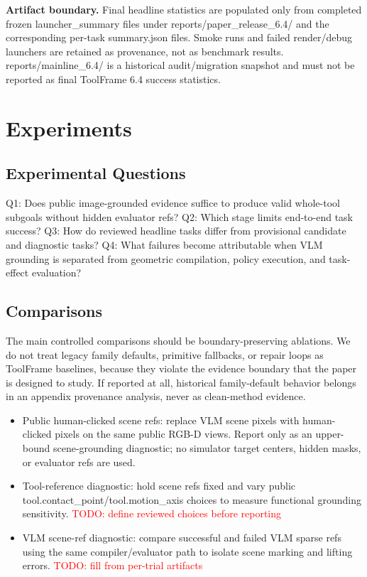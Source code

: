 \documentclass[journal]{IEEEtran}
\newcommand{\todo}[1]{\textcolor{red}{TODO: #1}}
\newcommand{\method}{ToolFrame}
\begin{document}
\textbf{Artifact boundary.} Final headline statistics are populated only from
completed frozen launcher\_summary files under reports/paper\_release\_6.4/ and
the corresponding per-task summary.json files. Smoke runs and failed
render/debug launchers are retained as provenance, not as benchmark results.
reports/mainline\_6.4/ is a historical audit/migration snapshot and must not be
reported as final \method{} 6.4 success statistics.

\section{Experiments}
\subsection{Experimental Questions}
Q1: Does public image-grounded evidence suffice to produce valid whole-tool
subgoals without hidden evaluator refs? Q2: Which stage limits end-to-end task
success? Q3: How do reviewed headline tasks differ from provisional candidate
and diagnostic tasks? Q4: What failures become attributable when VLM grounding
is separated from geometric compilation, policy execution, and task-effect
evaluation?

\subsection{Comparisons}
The main controlled comparisons should be boundary-preserving ablations. We do
not treat legacy family defaults, primitive fallbacks, or repair loops as
\method{} baselines, because they violate the evidence boundary that the paper
is designed to study. If reported at all, historical family-default behavior
belongs in an appendix provenance analysis, never as clean-method evidence.

\begin{itemize}
  \item Public human-clicked scene refs: replace VLM scene pixels with
  human-clicked pixels on the same public RGB-D views. Report only as an
  upper-bound scene-grounding diagnostic; no simulator target centers, hidden
  masks, or evaluator refs are used.
  \item Tool-reference diagnostic: hold scene refs fixed and vary public
  tool.contact\_point/tool.motion\_axis choices to measure functional grounding
  sensitivity. \todo{define reviewed choices before reporting}
  \item VLM scene-ref diagnostic: compare successful and failed VLM sparse refs
  using the same compiler/evaluator path to isolate scene marking and lifting
  errors. \todo{fill from per-trial artifacts}
\end{itemize}
\end{document}
